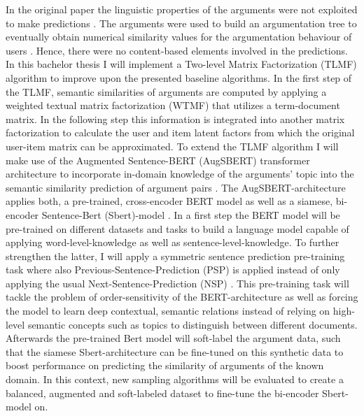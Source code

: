 \documentclass{article}
\begin{document}
In the original paper the linguistic properties of the arguments were not exploited to make predictions \cite{HowIArgue}. 
The arguments were used to build an argumentation tree to eventually obtain numerical similarity
values for the argumentation behaviour of users \cite{brenneis2020much}. Hence, there were no content-based elements involved
in the predictions.\\ 
In this bachelor thesis I will implement a Two-level Matrix Factorization (TLMF) algorithm to improve upon the presented baseline algorithms.\cite{li2016two}
In the first step of the TLMF, semantic similarities of arguments are computed by applying a weighted textual matrix factorization (WTMF) that utilizes a term-document matrix.
In the following step this information is integrated into another matrix factorization to calculate the
user and item latent factors from which the original user-item matrix can be approximated.
To extend the TLMF algorithm I will make use of the Augmented Sentence-BERT (AugSBERT) transformer architecture to incorporate
in-domain knowledge of the arguments' topic into the semantic similarity prediction of argument pairs \cite{thakur2020augmented}.
The AugSBERT-architecture applies both, a pre-trained, cross-encoder BERT model as well as a siamese, bi-encoder Sentence-Bert (Sbert)-model \cite{reimers2019sentence}.
In a first step the BERT model will be pre-trained on different datasets and tasks to build a language model capable of applying word-level-knowledge 
as well as sentence-level-knowledge. To further strengthen the latter, I will apply a symmetric sentence prediction pre-training task where also Previous-Sentence-Prediction (PSP) is applied
instead of only applying the usual Next-Sentence-Prediction (NSP) \cite{xu2020symmetric}.
This pre-training task will tackle the problem of order-sensitivity of the BERT-architecture as well as forcing the model to learn deep contextual, semantic relations instead
of relying on high-level semantic concepts such as topics to distinguish between different documents.
Afterwards the pre-trained Bert model will soft-label the argument data, such that the siamese Sbert-architecture can be fine-tuned
on this synthetic data to boost performance on predicting the similarity of arguments of the known domain.
In this context, new sampling algorithms will be evaluated to create a balanced, augmented and soft-labeled dataset to fine-tune the
bi-encoder Sbert-model on. 

\printbibliography
\end{document}
